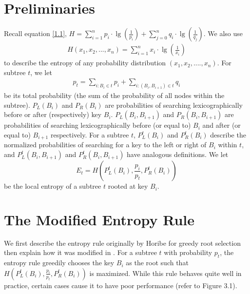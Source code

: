 \documentclass[letterpaper,12pt,titlepage,oneside,final]{book}
\theoremstyle{plain}
\begin{document}
\section{Preliminaries}

Recall equation \ref{1.1}, $H = \sum_{i=1}^{n} p_i\cdot\lg(\frac{1}{p_i}) + \sum_{j=0}^{n} q_i\cdot\lg(\frac{1}{q_j})$. We also use
\begin{align*}
H(x_1,x_2,...,x_n) = \sum_{i=1}^{n} x_i\cdot\lg(\frac{1}{x_i})
\end{align*} to describe the entropy of any probability distribution $(x_1, x_2, ...., x_n)$. For subtree $t$, we let 
\begin{align*}
p_t=\sum_{i : B_i \in t} p_i + \sum_{i : (B_i, B_{i+1}) \in t} q_i
\end{align*}
 be its total probability (the sum of the probability of all nodes within the subtree). $P_{L}(B_i)$ and $P_{R}(B_i)$ are probabilities of searching lexicographically before or after (respectively) key $B_i$. $P_{L}(B_i, B_{i+1})$ and $P_{R}(B_i, B_{i+1})$ are probabilities of searching lexicographically before (or equal to) $B_i$ and after (or equal to) $B_{i+1}$ respectively. For a subtree $t$, $P^t_L(B_i)$ and $P^t_R(B_i)$ describe the normalized probabilities of searching for a key to the left or right of $B_i$ within $t$, and $P^t_L(B_i,B_{i+1})$ and $P^t_R(B_i,B_{i+1})$ have analogous definitions. 
We let  
\begin{equation}
E_t=H(P^t_L(B_i), \frac{p_i}{p_t}, P^t_R(B_i))
\end{equation} be the local entropy of a subtree $t$ rooted at key $B_i$.  

\section{The Modified Entropy Rule}\label{The Modified Entropy Rule}

We first describe the entropy rule originally by Horibe \cite{horibe1977improved} for greedy root selection then explain how it was modified in \cite{guttler1980binary}. For a subtree $t$ with probability $p_t$, the entropy rule greedily chooses the key $B_i$ as the root such that $H(P^t_L(B_i), \frac{p_i}{p_t}, P^t_R(B_i))$ is maximized. While this rule behaves quite well in practice, certain cases cause it to have poor performance (refer to Figure 3.1). 
\end{document}
